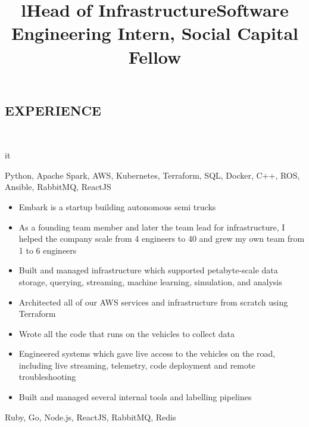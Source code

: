 \documentclass[]{res}
\begin{document}
\begin{resume}
\section{EXPERIENCE}
  \begin{format}  \\ \title{l}{it} \\ \body \end{format}
  \title{Head of Infrastructure}
  \begin{position}
    \begin{description}
      \item Python, Apache Spark, AWS, Kubernetes, Terraform, SQL, Docker, C++, ROS, Ansible, RabbitMQ, ReactJS
    \end{description}
    \begin{itemize}
      \item Embark is a startup building autonomous semi trucks
      \item As a founding team member and later the team lead for infrastructure, I helped the company scale from 4 engineers to 40 and grew my own team from 1 to 6 engineers
      \item Built and managed infrastructure which supported petabyte-scale data storage, querying, streaming, machine learning, simulation, and analysis
      \item Architected all of our AWS services and infrastructure from scratch using Terraform
      \item Wrote all the code that runs on the vehicles to collect data
      \item Engineered systems which gave live access to the vehicles on the road, including live streaming, telemetry, code deployment and remote troubleshooting
      \item Built and managed several internal tools and labelling pipelines
    \end{itemize}
  \end{position}
  \title{Software Engineering Intern, Social Capital Fellow}
  \begin{position}
    \begin{description}
      \item Ruby, Go, Node.js, ReactJS, RabbitMQ, Redis
    \end{description}

\end{position}
\end{resume}
\end{document}
